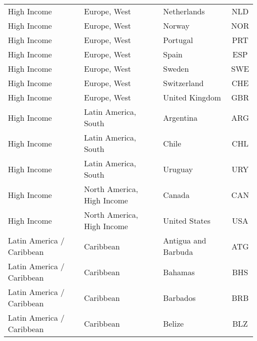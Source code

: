 \begin{longtable}{|p{3cm}|p{3.5cm}|p{5cm}|c|}
                   High Income &                 Europe, West &                                       Netherlands &  NLD \\
                   High Income &                 Europe, West &                                            Norway &  NOR \\
                   High Income &                 Europe, West &                                          Portugal &  PRT \\
                   High Income &                 Europe, West &                                             Spain &  ESP \\
                   High Income &                 Europe, West &                                            Sweden &  SWE \\
                   High Income &                 Europe, West &                                       Switzerland &  CHE \\
                   High Income &                 Europe, West &                                    United Kingdom &  GBR \\
                   High Income &         Latin America, South &                                         Argentina &  ARG \\
                   High Income &         Latin America, South &                                             Chile &  CHL \\
                   High Income &         Latin America, South &                                           Uruguay &  URY \\
                   High Income &   North America, High Income &                                            Canada &  CAN \\
                   High Income &   North America, High Income &                                     United States &  USA \\
     Latin America / Caribbean &                    Caribbean &                               Antigua and Barbuda &  ATG \\
     Latin America / Caribbean &                    Caribbean &                                           Bahamas &  BHS \\
     Latin America / Caribbean &                    Caribbean &                                          Barbados &  BRB \\
     Latin America / Caribbean &                    Caribbean &                                            Belize &  BLZ \\

\end{longtable}
